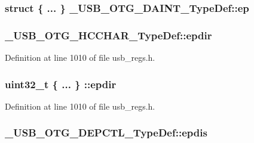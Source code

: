 \hypertarget{group___u_s_b___o_t_g___d_r_i_v_e_r_ga28342af4664393bab0bcdbfcd15ac1c4}{
\subsubsection[{ep}]{\setlength{\rightskip}{0pt plus 5cm}struct \{ ... \} 
   \-\_\-\-U\-S\-B\-\_\-\-O\-T\-G\-\_\-\-D\-A\-I\-N\-T\-\_\-\-Type\-Def\-::ep}}\label{group___u_s_b___o_t_g___d_r_i_v_e_r_ga28342af4664393bab0bcdbfcd15ac1c4}
\hypertarget{group___u_s_b___o_t_g___d_r_i_v_e_r_ga69aafd73ac0b1c4a83b7991da998294a}{
\subsubsection[{epdir}]{ \-\_\-\-U\-S\-B\-\_\-\-O\-T\-G\-\_\-\-H\-C\-C\-H\-A\-R\-\_\-\-Type\-Def\-::epdir}}\label{group___u_s_b___o_t_g___d_r_i_v_e_r_ga69aafd73ac0b1c4a83b7991da998294a}


Definition at line 1010 of file usb\-\_\-regs.\-h.

\hypertarget{group___u_s_b___o_t_g___d_r_i_v_e_r_ga288fb1ec932156b4bcaa59bf05a932d4}{
\subsubsection[{epdir}]{\setlength{\rightskip}{0pt plus 5cm}uint32\-\_\-t \{ ... \} \-::epdir}}\label{group___u_s_b___o_t_g___d_r_i_v_e_r_ga288fb1ec932156b4bcaa59bf05a932d4}


Definition at line 1010 of file usb\-\_\-regs.\-h.

\hypertarget{group___u_s_b___o_t_g___d_r_i_v_e_r_gab79051b0a8cc476d1e35fe02598a7989}{
\subsubsection[{epdis}]{ \-\_\-\-U\-S\-B\-\_\-\-O\-T\-G\-\_\-\-D\-E\-P\-C\-T\-L\-\_\-\-Type\-Def\-::epdis}}\label{group___u_s_b___o_t_g___d_r_i_v_e_r_gab79051b0a8cc476d1e35fe02598a7989}


